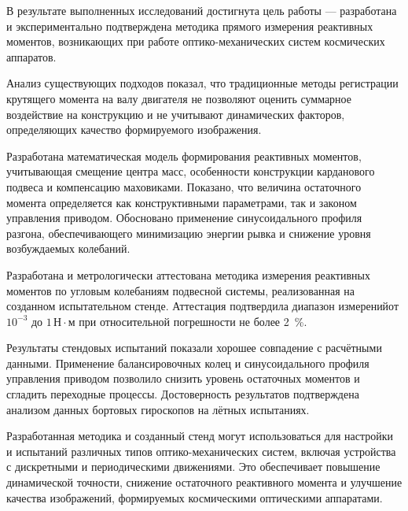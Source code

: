 

В результате выполненных исследований достигнута цель работы — разработана и экспериментально подтверждена методика прямого измерения реактивных моментов, возникающих при работе оптико-механических систем космических аппаратов.

Анализ существующих подходов показал, что традиционные методы регистрации крутящего момента на валу двигателя не позволяют оценить суммарное воздействие на конструкцию и не учитывают динамических факторов, определяющих качество формируемого изображения.

Разработана математическая модель формирования реактивных моментов, учитывающая смещение центра масс, особенности конструкции карданового подвеса и компенсацию маховиками. Показано, что величина остаточного момента определяется как конструктивными параметрами, так и законом управления приводом. Обосновано применение синусоидального профиля разгона, обеспечивающего минимизацию энергии рывка и снижение уровня возбуждаемых колебаний.

Разработана и метрологически аттестована методика измерения реактивных моментов по угловым колебаниям подвесной системы, реализованная на созданном испытательном стенде. Аттестация подтвердила диапазон измеренийот $10^{-3}$ до $1\,\text{Н}\cdot\text{м}$ при относительной погрешности не более 2~\%.

Результаты стендовых испытаний показали хорошее совпадение с расчётными данными. Применение балансировочных колец и синусоидального профиля управления приводом позволило снизить уровень остаточных моментов и сгладить переходные процессы. Достоверность результатов подтверждена анализом данных бортовых гироскопов на лётных испытаниях.

Разработанная методика и созданный стенд могут использоваться для настройки и испытаний различных типов оптико-механических систем, включая устройства с дискретными и периодическими движениями. Это обеспечивает повышение динамической точности, снижение остаточного реактивного момента и улучшение качества изображений, формируемых космическими оптическими аппаратами.